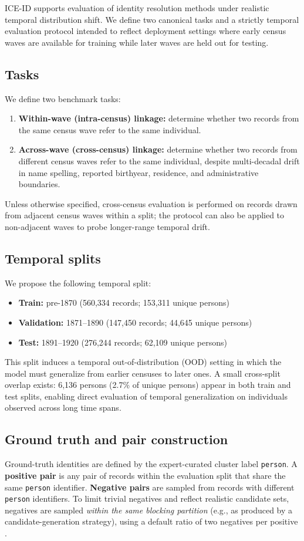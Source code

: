 \documentclass{article}
\begin{document}
ICE-ID supports evaluation of identity resolution methods under realistic temporal distribution shift. We define two canonical tasks and a strictly temporal evaluation protocol intended to reflect deployment settings where early census waves are available for training while later waves are held out for testing.

\subsection{Tasks}
We define two benchmark tasks:
\begin{enumerate}
    \item \textbf{Within-wave (intra-census) linkage:} determine whether two records from the same census wave refer to the same individual.
    \item \textbf{Across-wave (cross-census) linkage:} determine whether two records from different census waves refer to the same individual, despite multi-decadal drift in name spelling, reported birthyear, residence, and administrative boundaries.
\end{enumerate}
Unless otherwise specified, cross-census evaluation is performed on records drawn from adjacent census waves within a split; the protocol can also be applied to non-adjacent waves to probe longer-range temporal drift.

\subsection{Temporal splits}
We propose the following temporal split:
\begin{itemize}
    \item \textbf{Train:} pre-1870 (560,334 records; 153,311 unique persons)
    \item \textbf{Validation:} 1871--1890 (147,450 records; 44,645 unique persons)
    \item \textbf{Test:} 1891--1920 (276,244 records; 62,109 unique persons)
\end{itemize}
This split induces a temporal out-of-distribution (OOD) setting in which the model must generalize from earlier censuses to later ones. A small cross-split overlap exists: 6,136 persons (2.7\% of unique persons) appear in both train and test splits, enabling direct evaluation of temporal generalization on individuals observed across long time spans.

\subsection{Ground truth and pair construction}
Ground-truth identities are defined by the expert-curated cluster label \texttt{person}. A \textbf{positive pair} is any pair of records within the evaluation split that share the same \texttt{person} identifier. \textbf{Negative pairs} are sampled from records with different \texttt{person} identifiers. To limit trivial negatives and reflect realistic candidate sets, negatives are sampled \emph{within the same blocking partition} (e.g., as produced by a candidate-generation strategy), using a default ratio of two negatives per positive \cite{payasyougo}.
\end{document}
